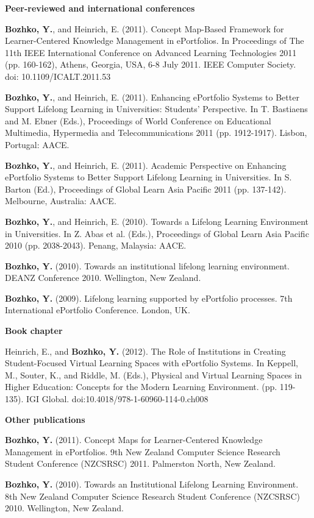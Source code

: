 \label{sec:pub}
\LARGE \textbf{Peer-reviewed and international conferences}

\normalsize
\textbf{Bozhko, Y.}, and Heinrich, E. (2011). Concept Map-Based Framework for
Learner-Centered Knowledge Management in ePortfolios. In Proceedings of The 11th
IEEE International Conference on Advanced Learning Technologies 2011 (pp.
160-162), Athens, Georgia, USA, 6-8 July 2011. IEEE Computer Society. doi:
10.1109/ICALT.2011.53

\textbf{Bozhko, Y.}, and Heinrich, E. (2011). Enhancing ePortfolio Systems to
Better Support Lifelong Learning in Universities: Students' Perspective. In T.
Bastiaens and M. Ebner (Eds.), Proceedings of World Conference on Educational
Multimedia, Hypermedia and Telecommunications 2011 (pp. 1912-1917). Lisbon,
Portugal: AACE.

\textbf{Bozhko, Y.}, and Heinrich, E. (2011). Academic Perspective on Enhancing
ePortfolio Systems to Better Support Lifelong Learning in Universities. In S.
Barton (Ed.), Proceedings of Global Learn Asia Pacific 2011 (pp. 137-142).
Melbourne, Australia: AACE.

﻿\textbf{Bozhko, Y.}, and Heinrich, E. (2010). Towards a Lifelong Learning
Environment in Universities. In Z. Abas et al. (Eds.), Proceedings of Global
Learn Asia Pacific 2010 (pp. 2038-2043). Penang, Malaysia: AACE. 

\textbf{Bozhko, Y.} (2010). Towards an institutional lifelong learning
environment. DEANZ Conference 2010. Wellington, New Zealand.

\textbf{Bozhko, Y.} (2009). Lifelong learning supported by ePortfolio processes.
7th International ePortfolio Conference. London, UK.

\LARGE \textbf{Book chapter}

\normalsize
Heinrich, E., and \textbf{Bozhko, Y.} (2012). The Role of Institutions in Creating
Student-Focused Virtual Learning Spaces with ePortfolio Systems. In Keppell, M.,
Souter, K., and Riddle, M. (Eds.), Physical and Virtual Learning Spaces in
Higher Education: Concepts for the Modern Learning Environment. (pp. 119-135). 
IGI Global. doi:10.4018/978-1-60960-114-0.ch008

\LARGE \textbf{Other publications}

\normalsize
\textbf{Bozhko, Y.} (2011). Concept Maps for Learner-Centered Knowledge
Management in ePortfolios. 9th New Zealand Computer Science Research Student Conference
(NZCSRSC) 2011. Palmerston North, New Zealand.

\textbf{Bozhko, Y.} (2010). Towards an Institutional Lifelong Learning
Environment. 8th New Zealand Computer Science Research Student Conference (NZCSRSC) 2010.
Wellington, New Zealand.




